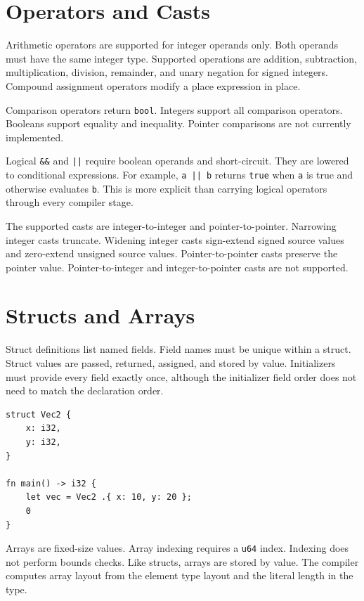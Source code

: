 \section{Operators and Casts}

Arithmetic operators are supported for integer operands only. Both operands must
have the same integer type. Supported operations are addition, subtraction,
multiplication, division, remainder, and unary negation for signed integers.
Compound assignment operators modify a place expression in place.

Comparison operators return \texttt{bool}. Integers support all comparison
operators. Booleans support equality and inequality. Pointer comparisons are not
currently implemented.

Logical \texttt{\&\&} and \texttt{||} require boolean operands and short-circuit.
They are lowered to conditional expressions. For example, \texttt{a || b}
returns \texttt{true} when \texttt{a} is true and otherwise evaluates
\texttt{b}. This is more explicit than carrying logical operators through every
compiler stage.

The supported casts are integer-to-integer and pointer-to-pointer. Narrowing
integer casts truncate. Widening integer casts sign-extend signed source values
and zero-extend unsigned source values. Pointer-to-pointer casts preserve the
pointer value. Pointer-to-integer and integer-to-pointer casts are not supported.

\section{Structs and Arrays}

Struct definitions list named fields. Field names must be unique within a
struct. Struct values are passed, returned, assigned, and stored by value.
Initializers must provide every field exactly once, although the initializer
field order does not need to match the declaration order.

\begin{lstlisting}[language=EPL,caption={Struct declaration and initialization}]
struct Vec2 {
	x: i32,
	y: i32,
}

fn main() -> i32 {
	let vec = Vec2 .{ x: 10, y: 20 };
	0
}
\end{lstlisting}

Arrays are fixed-size values. Array indexing requires a \texttt{u64} index.
Indexing does not perform bounds checks. Like structs, arrays are stored by
value. The compiler computes array layout from the element type layout and the
literal length in the type.

